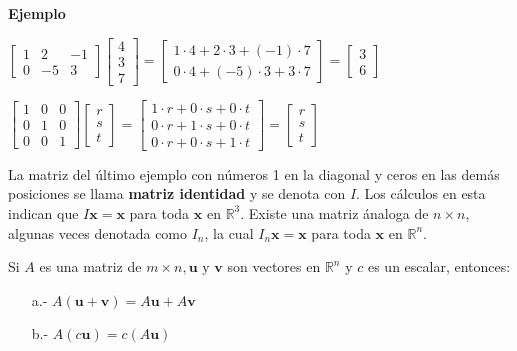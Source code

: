 \documentclass{article}
\begin{document}
\begin{large}
    \textbf{Ejemplo}
\end{large}

$\begin{bmatrix}
    1 & 2 & -1\\
    0 & -5 & 3
\end{bmatrix}
\begin{bmatrix} 4\\3\\7 \end{bmatrix}
=\begin{bmatrix}
    1\cdot4 + 2\cdot3 + (-1)\cdot7\\
    0\cdot4 + (-5)\cdot3 + 3\cdot7 
\end{bmatrix}
= \begin{bmatrix} 3\\6 \end{bmatrix}$

$\begin{bmatrix}
    1 & 0 & 0\\
    0 & 1 & 0\\
    0 & 0 & 1
\end{bmatrix}
\begin{bmatrix} r\\s\\t \end{bmatrix}
=\begin{bmatrix}
    1\cdot r + 0\cdot s + 0\cdot t\\
    0\cdot r + 1\cdot s + 0\cdot t\\
    0\cdot r + 0\cdot s + 1\cdot t
\end{bmatrix}
= \begin{bmatrix} r\\s\\t \end{bmatrix}$

La matriz del último ejemplo con números 1 en la diagonal y ceros en las demás posiciones se llama \textbf{matriz identidad} y se denota con $I$. Los cálculos en esta indican que $I\mathbf{x} =  \mathbf{x}$ para toda $\mathbf{x}$ en $\mathbb{R}^3$. Existe una matriz ánaloga de $n \times n$, algunas veces denotada como $I_n$, la cual $I_n\mathbf{x} = \mathbf{x}$ para toda $\mathbf{x}$ en $\mathbb{R}^n$. \cite{DavidC}

\begin{tcolorbox}[colback=blue!10!white,colframe=blue!60!black,title=Propiedades del producto matriz-vector $A\mathbf{x}$]
    Si $A$ es una matriz de $m\times n, \mathbf{u} \text{ y } \mathbf{v}$ son vectores en $\mathbb{R}^n$ y $c$ es un escalar, entonces: 
    \begin{itemize}
        \item[a.-]  $A(\mathbf{u} + \mathbf{v}) = A\mathbf{u} + A\mathbf{v}$
        \item[b.-] $A(c\mathbf{u}) = c(A\mathbf{u})$ 
    \end{itemize}
\end{tcolorbox}
\end{document}
